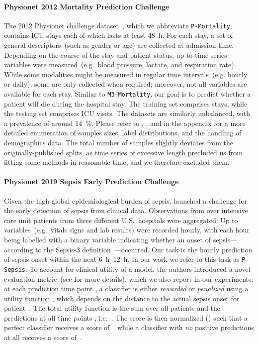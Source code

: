 \documentclass{article}
\newcommand{\dataset}[1]{\texttt{#1}}
\begin{document}
\paragraph{Physionet 2012 Mortality Prediction Challenge}
The 2012 Physionet challenge dataset~\citep{goldberger2000physiobank},
which we abbreviate \dataset{P-Mortality}, contains  ICU stays
each of which lasts at least \SI{48}{\hour}.
For each stay, a set of general descriptors~(such as gender or age)
are collected at admission time.
Depending on the course of the stay and patient status, up to  time series
variables were measured~(e.g.\ blood pressure, lactate, and respiration
rate).
While some modalities might be measured in regular time intervals~(e.g.
hourly or daily), some are only collected when required; moreover, not
all variables are available for each stay. 
Similar to \dataset{M3-Mortality}, our goal is to predict whether a patient
will die during the hospital stay. 
The training set comprises  stays, while the testing set
comprises  ICU visits.
The datasets are similarly imbalanced, with a prevalence of around
\SI{14}{\percent}.
Please refer to , , and  in the
appendix for a more detailed enumeration of samples sizes, label
distributions, and the handling of demographics data.
The total number of samples slightly deviates from the
originally-published splits, as time series of excessive length
precluded us from fitting some methods in reasonable time, and we therefore
excluded them.

\paragraph{Physionet 2019 Sepsis Early Prediction Challenge}
Given the high global epidemiological burden of sepsis,
\citet{reyna2020early} launched a challenge for the early detection of
sepsis from clinical data. Observations from over  intensive
care unit patients from three different U.S.\ hospitals
were aggregated. Up to  variables~(e.g.\ vitals signs and lab results)
were recorded hourly, with each hour being labelled with a binary
variable indicating whether an onset of sepsis---according to the
\mbox{Sepsis-3} definition~\citep{seymour2016assessment}---occurred.
Our task is the hourly prediction of sepsis onset within the next
\SIrange{6}{12}{\hour}. In our work we refer to this task as \dataset{P-Sepsis}.
To account for clinical utility of a model, the authors introduced a novel evaluation 
metric~(see \citet{reyna2020early} for more details), which we also
report in our experiments: at each prediction time point , a classifier 
is either \emph{rewarded} or \emph{penalized} using a utility function
, which depends on the 
distance to the actual sepsis onset for patient~. The total utility function is the sum over 
all patients  and the predictions at all time points , i.e.\
.
The score is then normalized () such that a perfect classifier receives
a score of~, while a classifier with \emph{no} positive predictions
at all receives a score of~.
\end{document}
